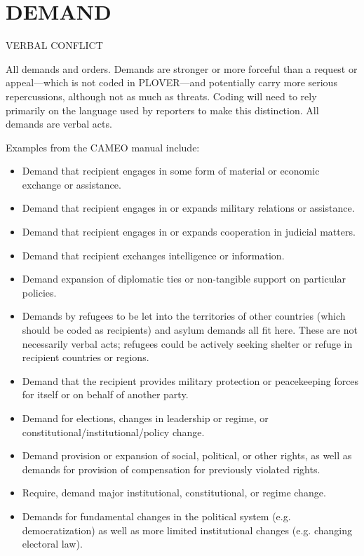 \documentclass[11pt]{report}
\begin{document}
\newpage  

\section{DEMAND}

\textsf{VERBAL CONFLICT} \vspace{8pt}


All demands and orders. Demands are stronger or more forceful than a request or appeal---which is not coded in PLOVER---and potentially carry more serious repercussions, although not as much as threats. Coding will need to rely primarily on the language used by reporters to make this distinction.  All demands are verbal acts. 

Examples from the CAMEO manual include:

\begin{itemize}
\item Demand that recipient engages in some form of material or economic exchange or assistance.
\item Demand that recipient engages in or expands military relations or assistance.
\item Demand that recipient engages in or expands cooperation in judicial matters.
\item Demand that recipient exchanges intelligence or information.
\item Demand expansion of diplomatic ties or non-tangible support on particular policies.
\item Demands by refugees to be let into the territories of other countries (which should be coded as recipients) and asylum demands all fit here. These are not necessarily verbal acts; refugees could be actively seeking shelter or refuge in recipient countries or regions.
\item Demand that the recipient provides military protection or peacekeeping forces  for itself or on behalf of another party.
\item Demand for elections, changes in leadership or regime, or constitutional/institutional/policy change.
\item Demand provision or expansion of social, political, or other rights, as well as demands for provision of compensation for previously violated rights.
\item Require, demand major institutional, constitutional, or regime change.
\item Demands for fundamental changes in the political system (e.g. democratization) as well as more limited institutional changes (e.g. changing electoral law).

\end{itemize}
\end{document}
